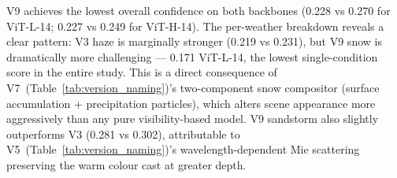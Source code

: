 \begin{table}[htbp]
\centering
\caption{Experiment~1: Zero-shot confidence and Top-1 accuracy on V3 and V9 pipeline outputs. Lower confidence = stronger domain shift. Per-weather breakdown shows where each pipeline's atmospheric effect is strongest.}
\label{tab:exp1_pipeline_comparison}
\renewcommand{\arraystretch}{1.3}
\end{table}

\noindent V9 achieves the lowest overall confidence on both backbones (0.228 vs 0.270 for ViT-L-14; 0.227 vs 0.249 for ViT-H-14). The per-weather breakdown reveals a clear pattern: V3 haze is marginally stronger (0.219 vs 0.231), but V9 snow is dramatically more challenging — 0.171 ViT-L-14, the lowest single-condition score in the entire study. This is a direct consequence of V7~(Table~\ref{tab:version_naming})'s two-component snow compositor (surface accumulation + precipitation particles), which alters scene appearance more aggressively than any pure visibility-based model. V9 sandstorm also slightly outperforms V3 (0.281 vs 0.302), attributable to V5~(Table~\ref{tab:version_naming})'s wavelength-dependent Mie scattering preserving the warm colour cast at greater depth.

